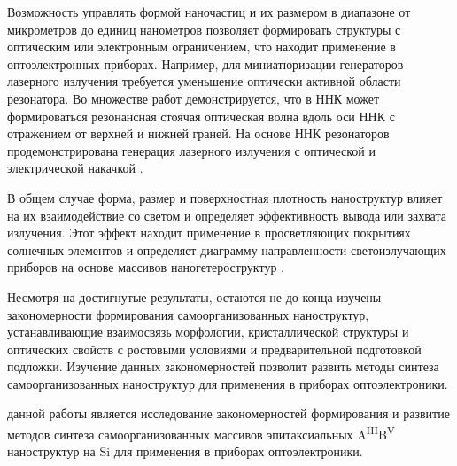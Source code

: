 Возможность управлять формой наночастиц и их размером в диапазоне от
микрометров до единиц нанометров позволяет формировать структуры с оптическим
или электронным ограничением, что находит применение в оптоэлектронных
приборах. Например, для миниатюризации генераторов лазерного излучения
требуется уменьшение оптически активной области резонатора. Во множестве работ
демонстрируется, что в ННК может формироваться резонансная стоячая оптическая
волна вдоль оси ННК с отражением от верхней и нижней граней. На основе ННК
резонаторов продемонстрирована генерация лазерного излучения с оптической и
электрической накачкой \cite{Eaton2016}.

В общем случае форма, размер и поверхностная плотность наноструктур влияет на
их взаимодействие со светом и определяет эффективность вывода или захвата
излучения. Этот эффект находит применение в просветляющих покрытиях солнечных
элементов \cite{Mozharov2015b, Krogman2005} и определяет диаграмму
направленности светоизлучающих приборов на основе массивов наногетероструктур
\cite{Eaton2016}.

Несмотря на достигнутые результаты, остаются не до конца изучены закономерности
формирования самоорганизованных наноструктур, устанавливающие взаимосвязь
морфологии, кристаллической структуры и оптических свойств с ростовыми
условиями и предварительной подготовкой подложки. Изучение данных
закономерностей позволит развить методы синтеза самоорганизованных наноструктур
для применения в приборах оптоэлектроники.



{\aim} данной работы является исследование закономерностей формирования и
развитие методов синтеза самоорганизованных массивов эпитаксиальных
A\textsuperscript{III}B\textsuperscript{V} наноструктур на Si для применения в
приборах оптоэлектроники.

